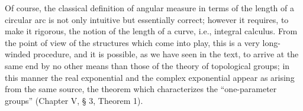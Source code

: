 Of course, the classical definition of angular measure in terms of the length of a circular arc is not only intuitive but essentially correct; however it requires, to make it rigorous, the notion of the length of a curve, i.e., integral calculus. From the point of view of the structures which come into play, this is a very long-winded procedure, and it is possible, as we have seen in the text, to arrive at the same end by no other means than those of the theory of topological groups; in this manner the real exponential and the complex exponential appear as arising from the same source, the theorem which characterizes the ``one-parameter groups'' (Chapter V, § 3, Theorem 1).

